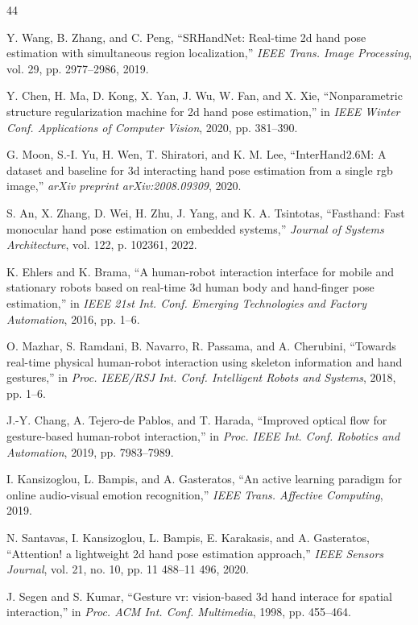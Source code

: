 \documentclass[11pt]{article}
\begin{document}
\begin{thebibliography}{44}

Y. Wang, B. Zhang, and C. Peng, ``SRHandNet: Real-time 2d hand pose estimation with simultaneous region localization,'' \emph{IEEE Trans. Image Processing}, vol. 29, pp. 2977--2986, 2019.

Y. Chen, H. Ma, D. Kong, X. Yan, J. Wu, W. Fan, and X. Xie, ``Nonparametric structure regularization machine for 2d hand pose estimation,'' in \emph{IEEE Winter Conf. Applications of Computer Vision}, 2020, pp. 381--390.

G. Moon, S.-I. Yu, H. Wen, T. Shiratori, and K. M. Lee, ``InterHand2.6M: A dataset and baseline for 3d interacting hand pose estimation from a single rgb image,'' \emph{arXiv preprint arXiv:2008.09309}, 2020.

S. An, X. Zhang, D. Wei, H. Zhu, J. Yang, and K. A. Tsintotas, ``Fasthand: Fast monocular hand pose estimation on embedded systems,'' \emph{Journal of Systems Architecture}, vol. 122, p. 102361, 2022.

K. Ehlers and K. Brama, ``A human-robot interaction interface for mobile and stationary robots based on real-time 3d human body and hand-finger pose estimation,'' in \emph{IEEE 21st Int. Conf. Emerging Technologies and Factory Automation}, 2016, pp. 1--6.

O. Mazhar, S. Ramdani, B. Navarro, R. Passama, and A. Cherubini, ``Towards real-time physical human-robot interaction using skeleton information and hand gestures,'' in \emph{Proc. IEEE/RSJ Int. Conf. Intelligent Robots and Systems}, 2018, pp. 1--6.

J.-Y. Chang, A. Tejero-de Pablos, and T. Harada, ``Improved optical flow for gesture-based human-robot interaction,'' in \emph{Proc. IEEE Int. Conf. Robotics and Automation}, 2019, pp. 7983--7989.

I. Kansizoglou, L. Bampis, and A. Gasteratos, ``An active learning paradigm for online audio-visual emotion recognition,'' \emph{IEEE Trans. Affective Computing}, 2019.

N. Santavas, I. Kansizoglou, L. Bampis, E. Karakasis, and A. Gasteratos, ``Attention! a lightweight 2d hand pose estimation approach,'' \emph{IEEE Sensors Journal}, vol. 21, no. 10, pp. 11 488--11 496, 2020.

J. Segen and S. Kumar, ``Gesture vr: vision-based 3d hand interace for spatial interaction,'' in \emph{Proc. ACM Int. Conf. Multimedia}, 1998, pp. 455--464.


\end{thebibliography}
\end{document}
